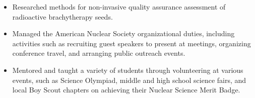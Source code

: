 \begin{minipage}{\textwidth}
	\begin{itemize}
		\item Researched methods for non-invasive quality assurance assessment of radioactive brachytherapy seeds.
		\item Managed the American Nuclear Society organizational duties, including activities such as recruiting guest speakers to present at meetings, organizing conference travel, and arranging public outreach events.
		\item Mentored and taught a variety of students through volunteering at various events, such as Science Olympiad, middle and high school science fairs, and local Boy Scout chapters on achieving their Nuclear Science Merit Badge.
	\end{itemize}
\end{minipage}
